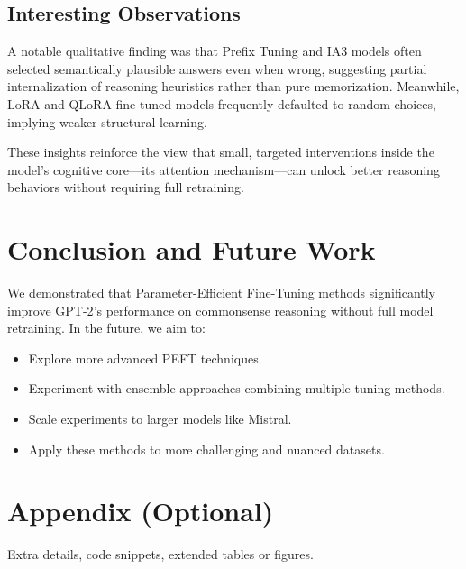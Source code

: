 \documentclass[11pt,twocolumn]{article}
\begin{document}
\subsection{Interesting Observations}
A notable qualitative finding was that Prefix Tuning and IA3 models often selected semantically plausible answers even when wrong, suggesting partial internalization of reasoning heuristics rather than pure memorization. Meanwhile, LoRA and QLoRA-fine-tuned models frequently defaulted to random choices, implying weaker structural learning.

These insights reinforce the view that small, targeted interventions inside the model's cognitive core—its attention mechanism—can unlock better reasoning behaviors without requiring full retraining.




\section{Conclusion and Future Work}
\label{sec:conclusion}
We demonstrated that Parameter-Efficient Fine-Tuning methods significantly improve GPT-2's performance on commonsense reasoning without full model retraining. In the future, we aim to:
\begin{itemize}
    \item Explore more advanced PEFT techniques.
    \item Experiment with ensemble approaches combining multiple tuning methods.
    \item Scale experiments to larger models like Mistral.
    \item Apply these methods to more challenging and nuanced datasets.
\end{itemize}



\printbibliography[
heading=bibintoc,
title={Whole bibliography}
]

\appendix
\section{Appendix (Optional)}
Extra details, code snippets, extended tables or figures.
\end{document}

